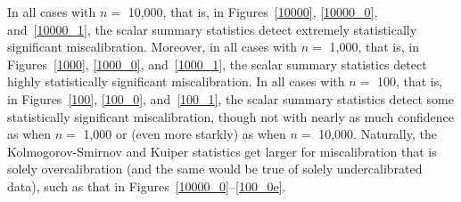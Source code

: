 \documentclass{article}
\begin{document}
In all cases with $n =$ 10,000, that is, in Figures~\ref{10000}, \ref{10000_0},
and~\ref{10000_1}, the scalar summary statistics detect
extremely statistically significant miscalibration.
Moreover, in all cases with $n =$ 1,000, that is, in Figures~\ref{1000},
\ref{1000_0}, and~\ref{1000_1}, the scalar summary statistics detect
highly statistically significant miscalibration.
In all cases with $n =$ 100, that is, in Figures~\ref{100}, \ref{100_0},
and~\ref{100_1}, the scalar summary statistics detect
some statistically significant miscalibration,
though not with nearly as much confidence as when $n =$ 1,000
or (even more starkly) as when $n =$ 10,000.
Naturally, the Kolmogorov-Smirnov and Kuiper statistics get larger
for miscalibration that is solely overcalibration
(and the same would be true of solely undercalibrated data),
such as that in Figures~\ref{10000_0}--\ref{100_0e}.
\end{document}
